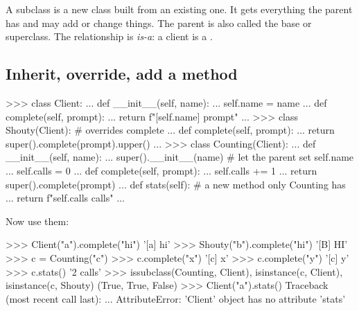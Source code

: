 A subclass is a new class built from an existing one. It gets everything the parent has and may
add or change things. The parent is also called the base or superclass. The relationship is
\emph{is-a}: a  client is a .

\begin{center}
\end{center}

\subsection{Inherit, override, add a method}

\begin{pycode}
>>> class Client:
...     def __init__(self, name):
...         self.name = name
...     def complete(self, prompt):
...         return f"[{self.name}] {prompt}"
...
>>> class Shouty(Client):                   # overrides complete
...     def complete(self, prompt):
...         return super().complete(prompt).upper()
...
>>> class Counting(Client):
...     def __init__(self, name):
...         super().__init__(name)          # let the parent set self.name
...         self.calls = 0
...     def complete(self, prompt):
...         self.calls += 1
...         return super().complete(prompt)
...     def stats(self):                    # a new method only Counting has
...         return f"{self.calls} calls"
...
\end{pycode}

Now use them:

\begin{pycode}
>>> Client("a").complete("hi")
'[a] hi'
>>> Shouty("b").complete("hi")
'[B] HI'
>>> c = Counting("c")
>>> c.complete("x")
'[c] x'
>>> c.complete("y")
'[c] y'
>>> c.stats()
'2 calls'
>>> issubclass(Counting, Client), isinstance(c, Client), isinstance(c, Shouty)
(True, True, False)
>>> Client("a").stats()
Traceback (most recent call last):
  ...
AttributeError: 'Client' object has no attribute 'stats'
\end{pycode}

